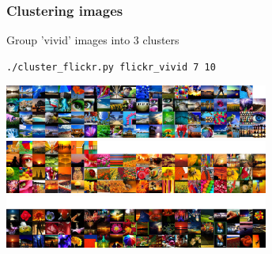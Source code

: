 \begin{frame}[fragile]
  \frametitle{Clustering images}

  \begin{center}

    \begin{block}{Group 'vivid' images into 3 clusters}
        \begin{lstlisting}[language=bash]
 ./cluster_flickr.py flickr_vivid 7 10
        \end{lstlisting}
    \end{block}
    \vskip20pt
    \includegraphics[width=0.65\textwidth]{../../code/image_data/flickr_vivid_cluster_1.png}
    \vskip10pt
    \includegraphics[width=0.65\textwidth]{../../code/image_data/flickr_vivid_cluster_2.png}
    \includegraphics[width=0.65\textwidth]{../../code/image_data/flickr_vivid_cluster_3.png}

  \end{center}

\end{frame}
